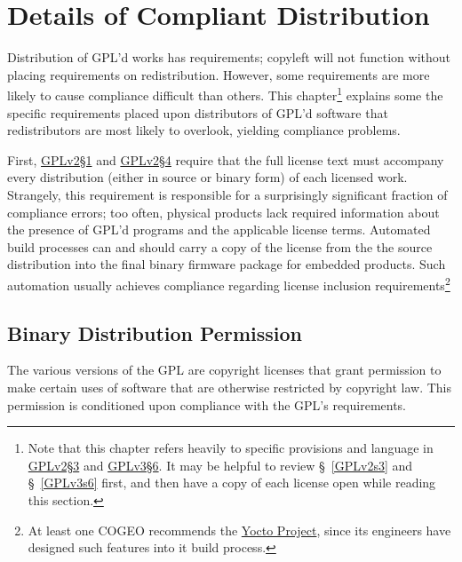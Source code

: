 \chapter{Details of Compliant Distribution}

Distribution of GPL'd works has requirements; copyleft will not function
without placing requirements on redistribution.  However, some requirements
are more likely to cause compliance difficult than others.  This
chapter\footnote{Note that this chapter refers heavily to specific provisions
  and language in
  \hyperref[GPLv2s3-full-text]{GPLv2\S3}
  and \hyperref[GPLv3s6-full-text]{GPLv3\S6}.
  It may be helpful  to review \S~\ref{GPLv2s3} and \S~\ref{GPLv3s6} first,
  and then have a copy of each license open while reading this
  section.}  explains some the specific requirements placed upon
distributors of GPL'd software that redistributors are most likely to
overlook, yielding compliance problems.

First, \hyperref[GPLv2s1]{GPLv2\S1} and \hyperref[GPLv2s4]{GPLv2\S4} require
that the full license text must accompany every distribution (either in
source or binary form) of each licensed work.  Strangely, this requirement is
responsible for a surprisingly significant fraction of compliance errors; too
often, physical products lack required information about the presence of
GPL'd programs and the applicable license terms.  Automated build processes
can and should carry a copy of the license from the the source distribution
into the final binary firmware package for embedded products.  Such
automation usually achieves compliance regarding license inclusion
requirements\footnote{At least one COGEO recommends the
  \href{https://www.yoctoproject.org/}{Yocto Project}, since its engineers
  have designed such features into it build process.}

\section{Binary Distribution Permission}
\label{binary-distribution-permission}


The various versions of the GPL are copyright licenses that grant
permission to make certain uses of software that are otherwise restricted
by copyright law.  This permission is conditioned upon compliance with the
GPL's requirements.

